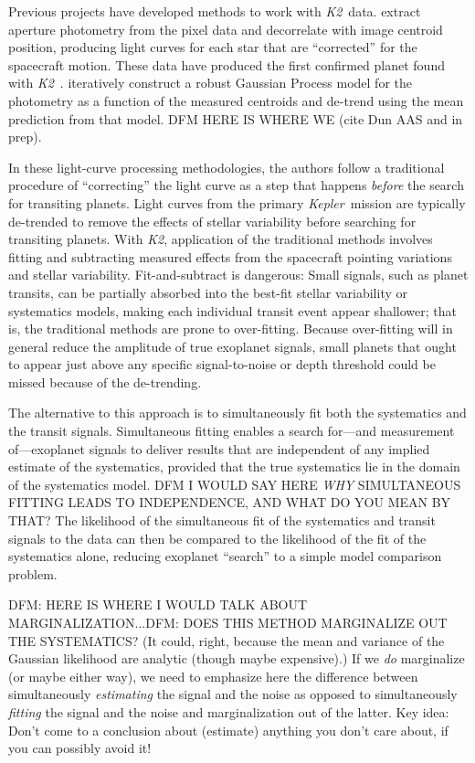 \documentclass[12pt,preprint]{aastex}
\newcommand{\project}[1]{\textsl{#1}} %
\newcommand{\kepler}{\project{Kepler}}
\newcommand{\KT}{\project{K2}}
\begin{document}
Previous projects have developed methods to work with \KT\ data.
\citet{Vanderburg:2014} extract aperture photometry from the pixel data
and decorrelate with image centroid position, producing light curves for each
star that are ``corrected'' for the spacecraft motion.
These data have produced the first confirmed planet found with
\KT\ \citep{Vanderburg:2015}.
\citet{Crossfield:2015} iteratively construct a robust Gaussian Process
model for the photometry as a function of the measured centroids and de-trend
using the mean prediction from that model.
DFM HERE IS WHERE WE (cite Dun AAS and in prep).

In these light-curve processing methodologies,
the authors follow a traditional procedure of ``correcting'' the light curve
as a step that happens \emph{before} the search for transiting planets.
Light curves from the primary \kepler\ mission are typically de-trended to
remove the effects of stellar variability before searching for transiting
planets.
With \KT, application of the traditional methods involves fitting and subtracting measured
effects from the spacecraft pointing variations and stellar variability.
Fit-and-subtract is dangerous:
Small signals, such as planet transits, can be partially absorbed into the
best-fit stellar variability or systematics models, making each individual transit event appear
shallower; that is, the traditional methods are prone to over-fitting.
Because over-fitting will in general reduce the amplitude of true exoplanet signals,
small planets that ought to appear just above any specific signal-to-noise
or depth
threshold could be missed because of the de-trending.

The alternative to this approach is to simultaneously fit both the systematics
and the transit signals.
Simultaneous fitting enables a search for---and measurement of---exoplanet signals
to deliver results that are
independent of any implied estimate of the systematics, provided that the true
systematics lie in the domain of the systematics model.
DFM I WOULD SAY HERE \emph{WHY} SIMULTANEOUS FITTING LEADS TO INDEPENDENCE, AND WHAT DO YOU MEAN BY THAT?
The likelihood of the simultaneous fit of the systematics and transit signals
to the data can then be compared to the likelihood of the fit of the systematics
alone, reducing exoplanet ``search'' to a simple model comparison problem.

DFM:  HERE IS WHERE I WOULD TALK ABOUT MARGINALIZATION...DFM: DOES THIS METHOD MARGINALIZE OUT THE SYSTEMATICS?  (It could,
right, because the mean and variance of the Gaussian likelihood are
analytic (though maybe expensive).)  If we \emph{do} marginalize (or
maybe either way), we need to emphasize here the difference between
simultaneously \emph{estimating} the signal and the noise as opposed
to simultaneously \emph{fitting} the signal and the noise and
marginalization out of the latter.  Key idea: Don't come to a
conclusion about (estimate) anything you don't care about, if you can
possibly avoid it!
\end{document}
